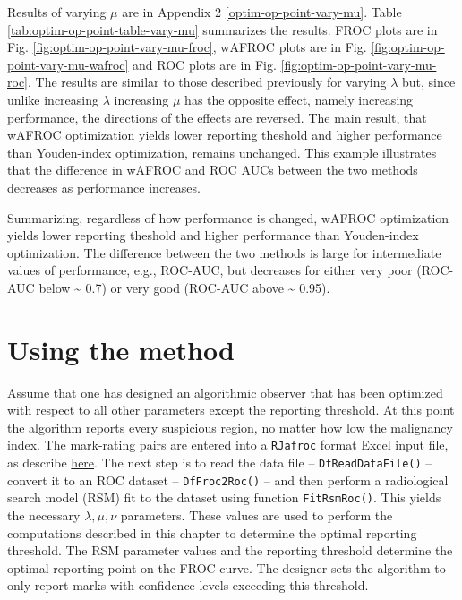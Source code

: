 \documentclass[
]{book}
\begin{document}
Results of varying \(\mu\) are in Appendix 2 \ref{optim-op-point-vary-mu}. Table \ref{tab:optim-op-point-table-vary-mu} summarizes the results. FROC plots are in Fig. \ref{fig:optim-op-point-vary-mu-froc}, wAFROC plots are in Fig. \ref{fig:optim-op-point-vary-mu-wafroc} and ROC plots are in Fig. \ref{fig:optim-op-point-vary-mu-roc}. The results are similar to those described previously for varying \(\lambda\) but, since unlike increasing \(\lambda\) increasing \(\mu\) has the opposite effect, namely increasing performance, the directions of the effects are reversed. The main result, that wAFROC optimization yields lower reporting theshold and higher performance than Youden-index optimization, remains unchanged. This example illustrates that the difference in wAFROC and ROC AUCs between the two methods decreases as performance increases.

Summarizing, regardless of how performance is changed, wAFROC optimization yields lower reporting theshold and higher performance than Youden-index optimization. The difference between the two methods is large for intermediate values of performance, e.g., ROC-AUC, but decreases for either very poor (ROC-AUC below \textasciitilde{} 0.7) or very good (ROC-AUC above \textasciitilde{} 0.95).

\hypertarget{optim-op-point-how-to-use-method}{%
\section{Using the method}\label{optim-op-point-how-to-use-method}}

Assume that one has designed an algorithmic observer that has been optimized with respect to all other parameters except the reporting threshold. At this point the algorithm reports every suspicious region, no matter how low the malignancy index. The mark-rating pairs are entered into a \texttt{RJafroc} format Excel input file, as describe \href{https://dpc10ster.github.io/RJafrocQuickStart/quick-start-froc-data-format.html}{here}. The next step is to read the data file -- \texttt{DfReadDataFile()} -- convert it to an ROC dataset -- \texttt{DfFroc2Roc()} -- and then perform a radiological search model (RSM) fit to the dataset using function \texttt{FitRsmRoc()}. This yields the necessary \(\lambda, \mu, \nu\) parameters. These values are used to perform the computations described in this chapter to determine the optimal reporting threshold. The RSM parameter values and the reporting threshold determine the optimal reporting point on the FROC curve. The designer sets the algorithm to only report marks with confidence levels exceeding this threshold.
\end{document}
